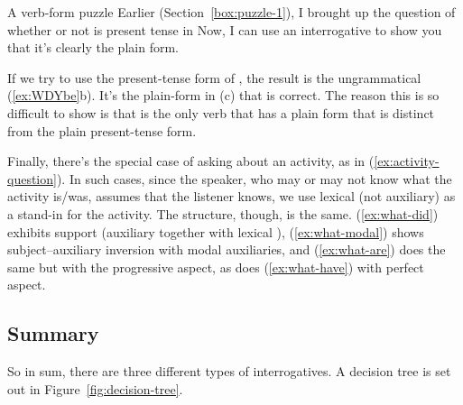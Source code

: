 \begin{tblsframed}{A verb-form puzzle}
\label{box:puzzle-2}
\setlength{\parindent}{1.5em}
    \noindent
Earlier (Section~\ref{box:puzzle-1}), I brought up the question of whether or not  is present tense in  Now, I can use an interrogative to show you that it's clearly the plain form.

\ea \label{ex:WDYbe}
    \z
\z
\indent If we try to use the present-tense form of , the result is the ungrammatical (\ref{ex:WDYbe}b). It's the plain-form  in (c) that is correct. The reason this is so difficult to show is that  is the only verb that has a plain form that is distinct from the plain present-tense form.

\end{tblsframed}


Finally, there's the special case of asking about an activity, as in (\ref{ex:activity-question}). In such cases, since the speaker, who may or may not know what the activity is/was, assumes that the listener knows, we use lexical (not auxiliary)  as a stand-in for the activity. The structure, though, is the same. (\ref{ex:what-did}) exhibits  support (auxiliary  together with lexical ), (\ref{ex:what-modal}) shows subject--auxiliary inversion with modal auxiliaries, and (\ref{ex:what-are}) does the same but with the progressive aspect, as does (\ref{ex:what-have}) with perfect aspect.

\ea\label{ex:activity-question}
    \label{ex:what-did}
    \label{ex:what-modal}
    \label{ex:what-are}
    \label{ex:what-have}
    \z
\z

\subsection{Summary}
So in sum, there are three different types of interrogatives. A decision tree is set out in Figure~\ref{fig:decision-tree}.

